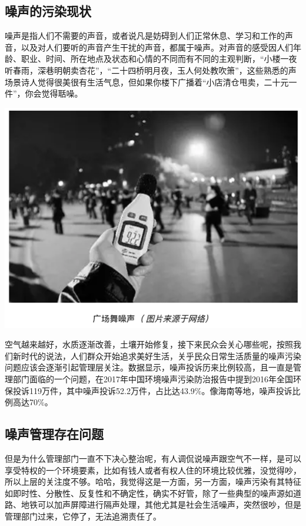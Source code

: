 \documentclass[
]{book}
\begin{document}
\hypertarget{ux566aux58f0ux7684ux6c61ux67d3ux73b0ux72b6}{%
\subsection{噪声的污染现状}\label{ux566aux58f0ux7684ux6c61ux67d3ux73b0ux72b6}}

噪声是指人们不需要的声音，或者说凡是妨碍到人们正常休息、学习和工作的声音，以及对人们要听的声音产生干扰的声音，都属于噪声。对声音的感受因人们年龄、职业、时间、所在地点及状态和心情的不同而有不同的主观判断，``小楼一夜听春雨，深巷明朝卖杏花''，``二十四桥明月夜，玉人何处教吹箫''，这些熟悉的声场景诗人觉得很美很有生活气息，但如果你楼下广播着``小店清仓甩卖，二十元一件''，你会觉得聒噪。

\includegraphics[width=8.33in]{images/zaosheng1}

空气越来越好，水质逐渐改善，土壤开始修复，接下来民众会关心哪些呢，按照我们新时代的说法，人们群众开始追求美好生活，关乎民众日常生活质量的噪声污染问题应该会逐渐引起管理层关注。数据显示，噪声投诉历来比例较高，且一直是管理部门面临的一个问题，在2017年中国环境噪声污染防治报告中提到2016年全国环保投诉119万件，其中噪声投诉52.2万件，占比达43.9\%。像海南等地，噪声投诉比例高达70\%。

\hypertarget{ux566aux58f0ux7ba1ux7406ux5b58ux5728ux95eeux9898}{%
\subsection{噪声管理存在问题}\label{ux566aux58f0ux7ba1ux7406ux5b58ux5728ux95eeux9898}}

但是为什么管理部门一直不下决心整治呢，有人调侃说噪声跟空气不一样，是可以享受特权的一个环境要素，比如有钱人或者有权人住的环境比较优雅，没觉得吵，所以上层的关注度不够。哈哈，我觉得这是一方面，另一方面，噪声污染有其特征如即时性、分散性、反复性和不确定性，确实不好管，除了一些典型的噪声源如道路、地铁可以加声屏障进行隔声处理，其他尤其是社会生活噪声，突然很吵，但是管理部门过来，它停了，无法追溯责任了。
\end{document}
